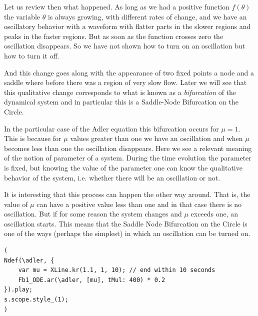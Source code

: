 \documentclass{article}
\begin{document}
Let us review then what happened. 
As long as we had a positive function $f(\theta)$ the variable $\theta$ is always growing, with different rates of change, and we have an oscillatory behavior with a waveform with flatter parts in the slower regions and peaks in the faster regions. 
But as soon as the function crosses zero the oscillation disappears. 
So we have not shown how to turn on an oscillation but how to turn it off. 

And this change goes along with the appearance of two fixed points a node and a saddle where before there was a region of very slow flow. 
Later we will see that this qualitative change corresponds to what is known as a {\em bifurcation} of the dynamical system and in particular this is a Saddle-Node Bifurcation on the Circle. 

In the particular case of the Adler equation this bifurcation occurs for $\mu=1$. 
This is because for $\mu$ values greater than one we have an oscillation and when $\mu$ becomes less than one the oscillation disappears. 
Here we see a relevant meaning of the notion of parameter of a system. 
During the time evolution the parameter is fixed, but knowing the value of the parameter one can know the qualitative behavior of the system, i.e. whether there will be an oscillation or not.

It is interesting that this process can happen the other way around. 
That is, the value of $\mu$ can have a positive value less than one and in that case there is no oscillation. But if for some reason the system changes and $\mu$ exceeds one, an oscillation starts. 
This means that the Saddle Node Bifurcation on the Circle is one of the ways (perhaps the simplest) in which an oscillation can be turned on. 

\newpage

\begin{lstlisting}[frame=single,caption=The end of an oscillation.]
(
Ndef(\adler, {
	var mu = XLine.kr(1.1, 1, 10); // end within 10 seconds
	Fb1_ODE.ar(\adler, [mu], tMul: 400) * 0.2
}).play;
s.scope.style_(1);
)
\end{lstlisting}
\end{document}
